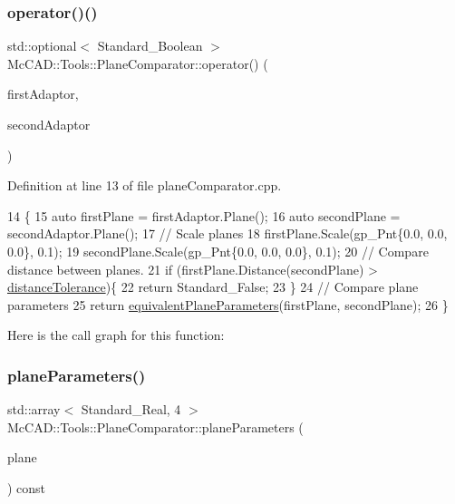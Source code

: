 \subsubsection{\texorpdfstring{operator()()}{operator()()}\hspace{0.1cm}{\footnotesize\ttfamily [2/2]}}
{\footnotesize\ttfamily std\+::optional$<$ Standard\+\_\+\+Boolean $>$ Mc\+C\+A\+D\+::\+Tools\+::\+Plane\+Comparator\+::operator() (\begin{DoxyParamCaption}\item[{const Geom\+Adaptor\+\_\+\+Surface \&}]{first\+Adaptor,  }\item[{const Geom\+Adaptor\+\_\+\+Surface \&}]{second\+Adaptor }\end{DoxyParamCaption})}



Definition at line 13 of file plane\+Comparator.\+cpp.


\begin{DoxyCode}
14                                                                                    \{
15     \textcolor{keyword}{auto} firstPlane = firstAdaptor.Plane();
16     \textcolor{keyword}{auto} secondPlane = secondAdaptor.Plane();
17     \textcolor{comment}{// Scale planes}
18     firstPlane.Scale(gp\_Pnt\{0.0, 0.0, 0.0\}, 0.1);
19     secondPlane.Scale(gp\_Pnt\{0.0, 0.0, 0.0\}, 0.1);
20     \textcolor{comment}{// Compare distance between planes.}
21     \textcolor{keywordflow}{if} (firstPlane.Distance(secondPlane) > \hyperlink{classMcCAD_1_1Tools_1_1PlaneComparator_a6e41cff0b95b5a5aa18de33ee9925e04}{distanceTolerance})\{
22         \textcolor{keywordflow}{return} Standard\_False;
23     \}
24     \textcolor{comment}{// Compare plane parameters}
25     \textcolor{keywordflow}{return} \hyperlink{classMcCAD_1_1Tools_1_1PlaneComparator_a6b3939e79155c791bdc5da4dc7d3b980}{equivalentPlaneParameters}(firstPlane, secondPlane);
26 \}
\end{DoxyCode}
Here is the call graph for this function\+:
\mbox{\label{classMcCAD_1_1Tools_1_1PlaneComparator_a1b61d399885072e2af2e3cd03d1ca6c3}} 
\subsubsection{\texorpdfstring{plane\+Parameters()}{planeParameters()}\hspace{0.1cm}{\footnotesize\ttfamily [1/2]}}
{\footnotesize\ttfamily std\+::array$<$ Standard\+\_\+\+Real, 4 $>$ Mc\+C\+A\+D\+::\+Tools\+::\+Plane\+Comparator\+::plane\+Parameters (\begin{DoxyParamCaption}\item[{const gp\+\_\+\+Pln \&}]{plane }\end{DoxyParamCaption}) const\hspace{0.3cm}{\ttfamily [private]}}



